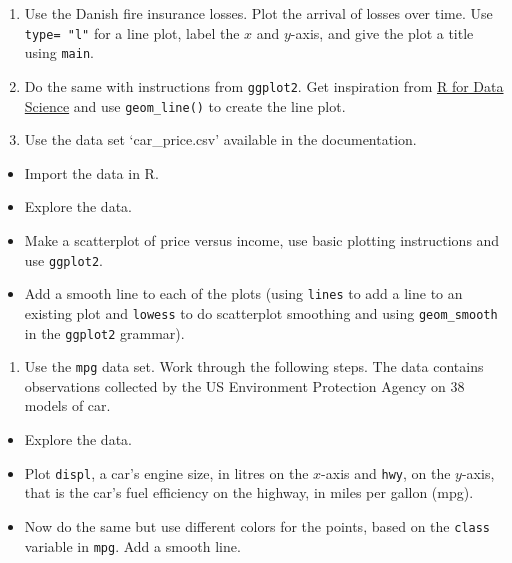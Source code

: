 \documentclass[
]{book}
\providecommand{\tightlist}{%
  \setlength{\itemsep}{0pt}\setlength{\parskip}{0pt}}
\begin{document}
\begin{enumerate}
\def\labelenumi{\arabic{enumi}.}
\item
  Use the Danish fire insurance losses. Plot the arrival of losses over time. Use \texttt{type=\ "l"} for a line plot, label the \(x\) and \(y\)-axis, and give the plot a title using \texttt{main}.
\item
  Do the same with instructions from \texttt{ggplot2}. Get inspiration from \href{http://r4ds.had.co.nz/data-visualisation.html}{R for Data Science} and use \texttt{geom\_line()} to create the line plot.
\item
  Use the data set `car\_price.csv' available in the documentation.
\end{enumerate}

\begin{itemize}
\tightlist
\item
  Import the data in R.
\item
  Explore the data.
\item
  Make a scatterplot of price versus income, use basic plotting instructions and use \texttt{ggplot2}.
\item
  Add a smooth line to each of the plots (using \texttt{lines} to add a line to an existing plot and \texttt{lowess} to do scatterplot smoothing and using \texttt{geom\_smooth} in the \texttt{ggplot2} grammar).
\end{itemize}

\begin{enumerate}
\def\labelenumi{\arabic{enumi}.}
\setcounter{enumi}{3}
\tightlist
\item
  Use the \texttt{mpg} data set. Work through the following steps. The data contains observations collected by the US Environment Protection Agency on 38 models of car.
\end{enumerate}

\begin{itemize}
\tightlist
\item
  Explore the data.
\item
  Plot \texttt{displ}, a car's engine size, in litres on the \(x\)-axis and \texttt{hwy}, on the \(y\)-axis, that is the car's fuel efficiency on the highway, in miles per gallon (mpg).
\item
  Now do the same but use different colors for the points, based on the \texttt{class} variable in \texttt{mpg}. Add a smooth line.
\end{itemize}

\begin{learncheck}

\end{learncheck}
\end{document}
